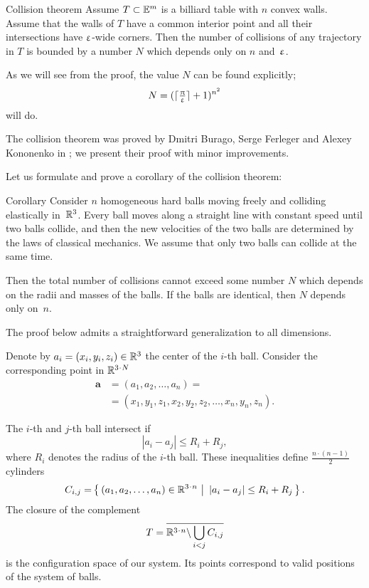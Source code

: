 \begin{thm}{Collision theorem}\label{thm:collision}
Assume $T\subset\EE^m$ is a billiard table with $n$ convex walls.
Assume that the walls of $T$ have a common interior point  and all their intersections have $\upvarepsilon$-wide corners.
Then the number of collisions of any trajectory in  $T$  is bounded
by a number $N$ which depends only on $n$ and~$\upvarepsilon$.
\end{thm}

As we will see from the proof,
the value $N$ can be found explicitly;
\[N=(\lceil\tfrac{\uppi}{\upvarepsilon}\rceil+1)^{n^2}\]
will do.

The collision theorem was proved by Dmitri Burago, Serge Ferleger and Alexey Kononenko in \cite{BFK};
we present their proof with minor improvements.

Let us formulate and prove a corollary of the  collision theorem:

\begin{thm}{Corollary}\label{cor:balls}
Consider $n$ homogeneous hard balls
moving freely and colliding
elastically in~$\mathbb{R}^3$. 
Every ball moves
along a straight line with constant speed until two balls collide, and then
the new velocities of the two balls are determined by the
laws of classical mechanics. 
We assume that only two balls can collide at the same time.

Then the total number of collisions cannot exceed some number $N$ which depends on the radii and masses of the balls.
If the balls are identical, then $N$ depends only on~$n$.
\end{thm}


The proof below admits a straightforward generalization to all dimensions.

Denote by $a_i=(x_i,y_i,z_i) \in \RR^3$ the center of the $i$-th ball.
Consider the corresponding point in $\RR^{3\cdot N}$
\begin{align*}
\bm{a}&=(a_1, a_2 , \dots , a_n ) =
\\
&=(x_1, y_1 , z_1 , x_2 , y_2 , z_2 , \dots , x_n , y_n , z_n).
\end{align*}

The $i$-th and $j$-th ball intersect if 
$$|a_i - a_j | \le R_i+R_j,$$
where $R_i$ denotes the radius of the $i$-th ball.
These inequalities define $\tfrac{n\cdot(n-1)}{2}$ cylinders 
\[C_{i,j}=\set{(a_1, a_2 , \dots , a_n )\in\RR^{3\cdot n}} {|a_i - a_j |\le R_i+R_j}.\] 
The closure of the complement
\[T=\overline{\RR^{3\cdot n}\backslash \bigcup_{i< j} C_{i,j}}\] 
is the configuration space of our system. 
Its points correspond
to valid positions of the system of balls.

